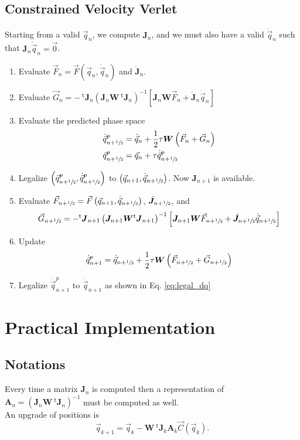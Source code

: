 \documentclass[11pt,aps,twocolumn]{revtex4}
\newcommand{\mymat}[1]{\boldsymbol{#1}}
\newcommand{\mytrn}[1]{{\!\!~^{\mathsf{t}}{#1}}}
\newcommand{\half}{\sfrac{1}{2}}
\newcommand{\q}{\vec{q}}
\newcommand{\dq}{\dot{\q}}
\newcommand{\C}{\vec{C}}
\newcommand{\J}{\mymat{J}}
\newcommand{\dJ}{\dot{\J}}
\newcommand{\tJ}{\mytrn{\J}}
\newcommand{\G}{\vec{G}}
\newcommand{\W}{\mymat{W}}
\newcommand{\A}{\mymat{A}}
\begin{document}
\subsection{Constrained Velocity Verlet}

Starting from a valid $\q_n$, we compute $\J_n$, and we must also have a valid $\dq_n$ such that $\J_n\dq_n=\vec{0}$.

\begin{enumerate}
	\item Evaluate $\vec{F}_n = \vec{F}(\q_n,\dq_n)$ and $\dJ_n$.
	\item Evaluate $\G_n = -\tJ_n \left(\J_n \W \tJ_n \right)^{-1}\left\lbrack \J_n\W\vec{F}_n + \dJ_n \dq_n \right\rbrack$
	\item Evaluate the predicted phase space
	\begin{align*}
	\dq_{n+\half}^p & = \dq_n + \frac{1}{2} \tau \W \left(\vec{F}_n + \G_n \right) \\
	\q_{n+\half}^p  & = \q_{n} + \tau \dq_{n+\half}^p
	\end{align*}
	\item Legalize $\left(\q_{n+\half}^p,\dq_{n+\half}^p\right)$ to $\left(\q_{n+1},\dq_{n+\half}\right)$. Now $\J_{n+1}$ is available.
	\item Evaluate $\vec{F}_{n+\half}=\vec{F}\left(\q_{n+1},\dq_{n+\half}\right)$, $\dJ_{n+\half}$, 
	and 
	$$
	\G_{n+\half}=-\tJ_{n+1} \left(\J_{n+1} \W \tJ_{n+1} \right)^{-1}\left\lbrack \J_{n+1}\W\vec{F}_{n+\half} + \dJ_{n+\half} \dq_{n+\half} \right\rbrack
	$$
	\item Update
	$$
		\dq_{n+1}^{p} = \dq_{n+\half} + \frac{1}{2} \tau \W\left(\vec{F}_{n+\half} + \vec{G}_{n+\half}\right)
	$$
	\item Legalize $\dq_{n+1}^{p}$ to $\dq_{n+1}$ as shown in Eq. \eqref{eq:legal_dq}
\end{enumerate}

\section{Practical Implementation}

\subsection{Notations}
Every time a matrix $\J_n$ is computed then  a representation of $\A_n = \left(\J_n \W\tJ_n\right)^{-1}$
must be computed as well.\\

An upgrade of positions is
$$
	\q_{k+1} = \q_{k} - \W \tJ_k  \A_{k} \C\left(\q_{k}\right).
$$
\end{document}
